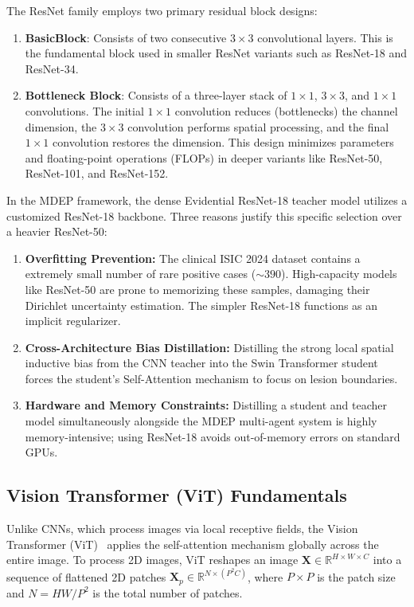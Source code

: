 \documentclass[11pt, a4paper]{article}
\begin{document}
The ResNet family employs two primary residual block designs:
\begin{enumerate}
    \item \textbf{BasicBlock}: Consists of two consecutive $3 \times 3$ convolutional layers. This is the fundamental block used in smaller ResNet variants such as ResNet-18 and ResNet-34.
    \item \textbf{Bottleneck Block}: Consists of a three-layer stack of $1 \times 1$, $3 \times 3$, and $1 \times 1$ convolutions. The initial $1 \times 1$ convolution reduces (bottlenecks) the channel dimension, the $3 \times 3$ convolution performs spatial processing, and the final $1 \times 1$ convolution restores the dimension. This design minimizes parameters and floating-point operations (FLOPs) in deeper variants like ResNet-50, ResNet-101, and ResNet-152.
\end{enumerate}

In the MDEP framework, the dense Evidential ResNet-18 teacher model utilizes a customized ResNet-18 backbone. Three reasons justify this specific selection over a heavier ResNet-50:
\begin{enumerate}[label=(\roman*)]
    \item \textbf{Overfitting Prevention:} The clinical ISIC 2024 dataset contains a extremely small number of rare positive cases (${\sim}390$). High-capacity models like ResNet-50 are prone to memorizing these samples, damaging their Dirichlet uncertainty estimation. The simpler ResNet-18 functions as an implicit regularizer.
    \item \textbf{Cross-Architecture Bias Distillation:} Distilling the strong local spatial inductive bias from the CNN teacher into the Swin Transformer student forces the student's Self-Attention mechanism to focus on lesion boundaries.
    \item \textbf{Hardware and Memory Constraints:} Distilling a student and teacher model simultaneously alongside the MDEP multi-agent system is highly memory-intensive; using ResNet-18 avoids out-of-memory errors on standard GPUs.
\end{enumerate}

\subsection{Vision Transformer (ViT) Fundamentals}

Unlike CNNs, which process images via local receptive fields, the Vision Transformer (ViT)~\cite{dosovitskiy2021image} applies the self-attention mechanism globally across the entire image. To process 2D images, ViT reshapes an image $\mathbf{X} \in \mathbb{R}^{H \times W \times C}$ into a sequence of flattened 2D patches $\mathbf{X}_p \in \mathbb{R}^{N \times (P^2 C)}$, where $P \times P$ is the patch size and $N = HW/P^2$ is the total number of patches. 
\end{document}
